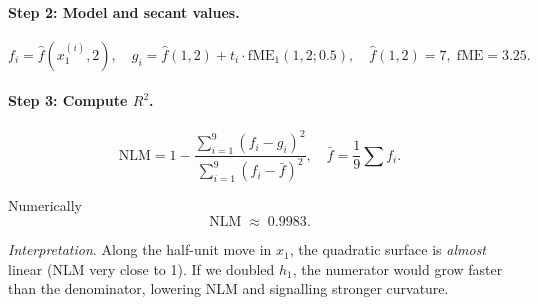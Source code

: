 {\begin{enumerate}[a)]
\paragraph{Step 2: Model and secant values.}
\[
  f_i = \hat f(x_1^{(i)},2), 
  \quad
  g_i = \hat f(1,2) + t_i\cdot \text{fME}_1(1,2;0.5),
  \quad
  \hat f(1,2)=7,\;
  \text{fME}=3.25.
\]

\paragraph{Step 3: Compute \(R^2\).}
\[
  \text{NLM}=1-\frac{\sum_{i=1}^{9}(f_i-g_i)^2}%
                     {\sum_{i=1}^{9}(f_i-\bar f)^2},
  \quad
  \bar f=\frac1{9}\sum f_i.
\]

Numerically  
\[
  \boxed{\text{NLM}\;\approx\;0.9983}.
\]

\emph{Interpretation}.  
Along the half-unit move in \(x_1\), the quadratic surface is
\emph{almost} linear (NLM very close to 1).  
If we doubled \(h_1\), the numerator would grow faster than the denominator,
lowering NLM and signalling stronger curvature.

\end{enumerate}

}
